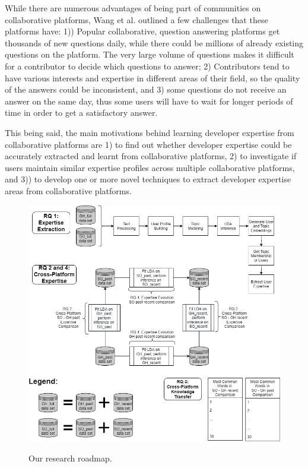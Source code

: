             While there are numerous advantages of being part of communities on collaborative platforms, Wang et al. \cite{wang2018survey} outlined a few challenges that these platforms have: 1)) Popular collaborative, question answering platforms get thousands of new questions daily, while there could be millions of already existing questions on the platform. The very large volume of questions makes it difficult for a contributor to decide which questions to answer; 2) Contributors tend to have various interests and expertise in different areas of their field, so the quality of the answers could be inconsistent, and 3) some questions do not receive an answer on the same day, thus some users will have to wait for longer periods of time in order to get a satisfactory answer. 
            
            This being said, the main motivations behind learning developer expertise from collaborative platforms are 1) to find out whether developer expertise could be accurately extracted and learnt from collaborative platforms, 2) to investigate if users maintain similar expertise profiles across multiple collaborative platforms, and 3)) to develop one or more novel techniques to extract developer expertise areas from collaborative platforms.
            
             \begin{figure}[!ht]
                  \centering
                  \includegraphics[width=\textwidth]{figures/roadmap.jpg}\\
                  \caption{Our research roadmap.}
                  \label{fig:roadmap.jpg}
            \end{figure}
    
